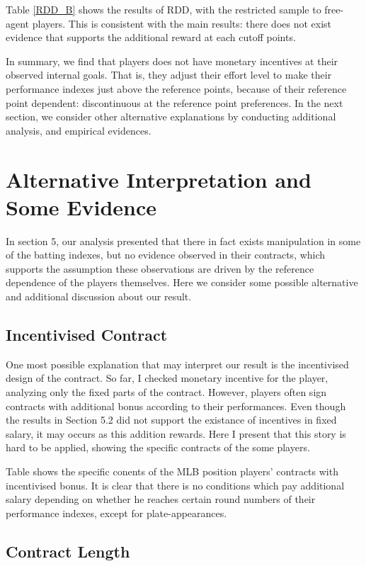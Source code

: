 \documentclass[dvipdfmx, 12pt]{article}
\begin{document}
Table \ref{RDD_B} shows the results of RDD, with the restricted sample to free-agent players. This is consistent with the main results: there does not exist evidence that supports the additional reward at each cutoff points.

In summary, we find that players does not have monetary incentives at their observed internal goals. That is, they adjust their effort level to make their performance indexes just above the reference points, because of their reference point dependent: discontinuous at the reference point preferences. In the next section, we consider other alternative explanations by conducting additional analysis, and empirical evidences. 

\section{Alternative Interpretation and Some Evidence}

In section 5, our analysis presented that there in fact exists manipulation in some of the batting indexes, but no evidence observed in their contracts, which supports the assumption these observations are driven by the reference dependence of the players themselves. Here we consider some possible alternative and additional discussion about our result.

\subsection{Incentivised Contract}

One most possible explanation that may interpret our result is the incentivised design of the contract. So far, I checked monetary incentive for the player, analyzing only the fixed parts of the contract. However, players often sign contracts with additional bonus according to their performances. Even though the results in Section 5.2 did not support the existance of incentives in fixed salary, it may occurs as this addition rewards. Here I present that this story is hard to be applied, showing the specific contracts of the some players.

Table %
shows the specific conents of the MLB position players' contracts with incentivised bonus. It is clear that there is no conditions which pay additional salary depending on whether he reaches certain round numbers of their performance indexes, except for plate-appearances.

\subsection{Contract Length}
\end{document}
